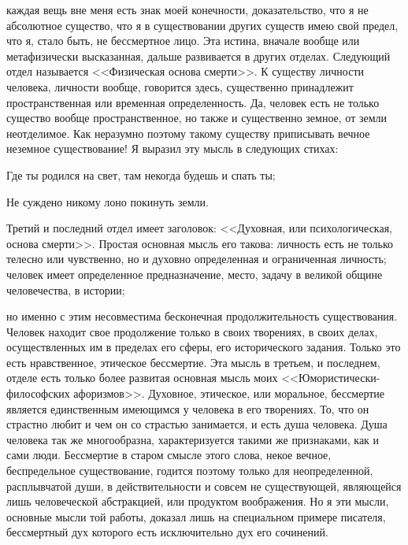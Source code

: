 \documentclass[12pt]{article}
\begin{document}
каждая вещь вне меня есть знак моей конечности, доказательство, что я не абсолютное существо, что я в существовании других существ имею свой предел, что я, стало быть, не бессмертное лицо. Эта истина, вначале вообще или метафизически высказанная, дальше развивается в других отделах. Следующий отдел называется <<Физическая основа смерти>>. К существу личности человека, личности вообще, говорится здесь, существенно принадлежит пространственная или временная определенность. Да, человек есть не только существо вообще пространственное, но также и существенно земное, от земли неотделимое. Как неразумно поэтому такому существу приписывать вечное неземное существование! Я выразил эту мысль в следующих стихах: 

Где ты родился на свет, там некогда будешь и спать ты; 

Не суждено никому лоно покинуть земли. 

Третий и последний отдел имеет заголовок: <<Духовная, или психологическая, основа смерти>>. Простая основная мысль его такова: личность есть не только телесно или чувственно, но и духовно определенная и ограниченная личность; человек имеет определенное предназначение, место, задачу в великой общине человечества, в истории; 

но именно с этим несовместима бесконечная продолжительность существования. Человек находит свое продолжение только в своих творениях, в своих делах, осуществленных им в пределах его сферы, его исторического задания. Только это есть нравственное, этическое бессмертие. Эта мысль в третьем, и последнем, отделе есть только более развитая основная мысль моих <<Юмористически-философских афоризмов>>. Духовное, этическое, или моральное, бессмертие является единственным имеющимся у человека в его творениях. То, что он страстно любит и чем он со страстью занимается, и есть душа человека. Душа человека так же многообразна, характеризуется такими же признаками, как и сами люди. Бессмертие в старом смысле этого слова, некое вечное, беспредельное существование, годится поэтому только для неопределенной, расплывчатой души, в действительности и совсем не существующей, являющейся лишь человеческой абстракцией, или продуктом воображения. Но я эти мысли, основные мысли той работы, доказал лишь на специальном примере писателя, бессмертный дух которого есть исключительно дух его сочинений. 
\end{document}
